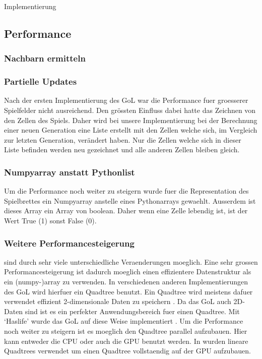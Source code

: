 \documentclass[runningheads]{llncs}
\begin{document}
\begin{section}{Implementierung}
    \subsection{Performance}

    \subsubsection{Nachbarn ermitteln}

    \subsubsection{Partielle Updates}
        Nach der ersten Implementierung des GoL war die Performance fuer groesserer Spielfelder nicht ausreichend.
        Den grössten Einfluss dabei hatte das Zeichnen von den Zellen des Spiels.
        Daher wird bei unsere Implementierung bei der Berechnung einer neuen Generation eine Liste erstellt mit den Zellen welche sich,
        im Vergleich zur letzten Generation, verändert haben.
        Nur die Zellen welche sich in dieser Liste befinden werden neu gezeichnet und alle anderen Zellen bleiben gleich.

    \subsubsection{Numpyarray anstatt Pythonlist}
        Um die Performance noch weiter zu steigern wurde fuer die Representation des Spielbrettes ein Numpyarray anstelle eines Pythonarrays gewaehlt.
        Ausserdem ist dieses Array ein Array von boolean. 
        Daher wenn eine Zelle lebendig ist, ist der Wert True (1) sonst False (0).

    
    \subsubsection{Weitere Performancesteigerung}
        sind durch sehr viele unterschiedliche Veraenderungen moeglich.
        Eine sehr grossen Performancesteigerung ist dadurch moeglich einen effizientere Datenstruktur als ein (numpy-)array zu verwenden.
        In verschiedenen anderen Implementierungen des GoL wird hierfuer ein Quadtree benutzt.
        Ein Quadtree wird meistens dafuer verwendet effizient 2-dimensionale Daten zu speichern \cite{quadtreeGeeksForGeeks}.
        Da das GoL auch 2D-Daten sind ist es ein perfekter Anwendungsbereich fuer einen Quadtree.
        Mit `Haslife' wurde das GoL auf diese Weise implementiert \cite{haslifeWiki}. \newline
        Um die Performance noch weiter zu steigern ist es moeglich den Quadtree parallel aufzubauen.
        Hier kann entweder die CPU oder auch die GPU benutzt werden.
        In \cite{quadtreesOnGPU} wurden lineare Quadtrees verwendet um einen Quadtree vollstaendig auf der GPU aufzubauen.

\end{section}
\end{document}
